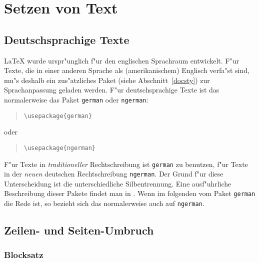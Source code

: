  
\section{Setzen von Text}
 

\subsection{Deutschsprachige Texte}\label{deutsch}
\LaTeX{} wurde urspr"unglich f"ur den englischen Sprachraum entwickelt.
F"ur Texte, die in einer anderen Sprache als (amerikanischem)
Englisch verfa"st sind, mu"s deshalb ein zus"atzliches Paket 
(siehe Abschnitt~\ref{docsty}) zur Sprachanpassung geladen werden.  
F"ur deutschsprachige Texte ist das normalerweise das Paket \texttt{german} 
oder \texttt{ngerman}:
\begin{verse}
\verb:\usepackage{german}:
\end{verse}
oder
\begin{verse}
\verb:\usepackage{ngerman}:
\end{verse}
F"ur Texte in \emph{traditioneller} Rechtschreibung ist \texttt{german}
zu benutzen, f"ur Texte in der \emph{neuen} deutschen Rechtschreibung
\texttt{ngerman}.
Der Grund f"ur diese Unterscheidung ist die unterschiedliche Silbentrennung.
Eine ausf"uhrliche Beschreibung dieser Pakete findet man in \cite{germdoc}.  
Wenn im folgenden vom Paket \texttt{german} die Rede ist, 
so bezieht sich das normalerweise auch auf \texttt{ngerman}.


\subsection{Zeilen- und Seiten-Umbruch}
 
\newenvironment{specialparskip}{%
  \par
  \setlength{\parindent}{0pt}%
  \setlength{\parskip}{5pt plus 2pt minus 1pt}%
}{%
  \par
}
 
\subsubsection{Blocksatz}

